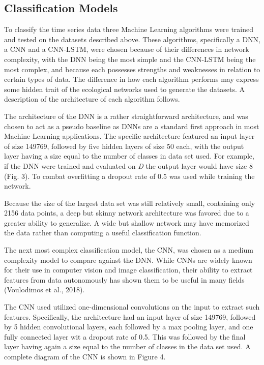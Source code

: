 \documentclass[letterpaper, 10 pt, conference]{ieeeconf}  %
\begin{document}
\subsection{Classification Models}
	To classify the time series data three Machine Learning algorithms were trained and tested on the datasets described above. These algorithms, specifically a DNN, a CNN and a CNN-LSTM, were chosen because of their differences in network complexity, with the DNN being the most simple and the CNN-LSTM being the most complex, and because each possesses strengths and weaknesses in relation to certain types of data. The difference in how each algorithm performs may express some hidden trait of the ecological networks used to generate the datasets. A description of the architecture of each algorithm follows.
    
    The architecture of the DNN is a rather straightforward architecture, and was chosen to act as a pseudo baseline as DNNs are a standard first approach in most Machine Learning applications. The specific architecture featured an input layer of size 149769, followed by five hidden layers of size 50 each, with the output layer having a size equal to the number of classes in data set used. For example, if the DNN were trained and evaluated on \textit{D} the output layer would have size 8 (Fig. 3). To combat overfitting a dropout rate of 0.5 was used while training the network. 
    
    Because the size of the largest data set was still relatively small, containing only 2156 data points, a deep but skinny network architecture was favored due to a greater ability to generalize. A wide but shallow network may have memorized the data rather than computing a useful classification function. 
    
    The next most complex classification model, the CNN, was chosen as a medium complexity model to compare against the DNN. While CNNs are widely known for their use in computer vision and image classification, their ability to extract features from data autonomously has shown them to be useful in many fields (Voulodimos et al., 2018). 
    
    The CNN used utilized one-dimensional convolutions on the input to extract such features. Specifically, the architecture had an input layer of size 149769, followed by 5 hidden convolutional layers, each followed by a max pooling layer, and one fully connected layer wit a dropout rate of 0.5. This was followed by the final layer having again a size equal to the number of classes in the data set used. A complete diagram of the CNN is shown in Figure 4. 
    
\end{document}
